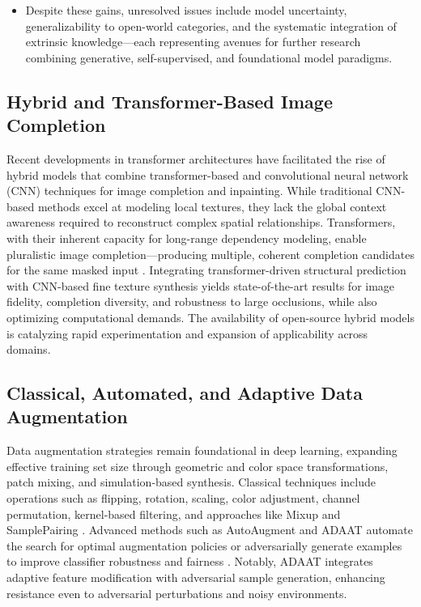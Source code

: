 \begin{itemize}
    \item Despite these gains, unresolved issues include model uncertainty, generalizability to open-world categories, and the systematic integration of extrinsic knowledge—each representing avenues for further research combining generative, self-supervised, and foundational model paradigms.
\end{itemize}

\subsection{Hybrid and Transformer-Based Image Completion}

Recent developments in transformer architectures have facilitated the rise of hybrid models that combine transformer-based and convolutional neural network (CNN) techniques for image completion and inpainting. While traditional CNN-based methods excel at modeling local textures, they lack the global context awareness required to reconstruct complex spatial relationships. Transformers, with their inherent capacity for long-range dependency modeling, enable pluralistic image completion---producing multiple, coherent completion candidates for the same masked input \cite{ref92}. Integrating transformer-driven structural prediction with CNN-based fine texture synthesis yields state-of-the-art results for image fidelity, completion diversity, and robustness to large occlusions, while also optimizing computational demands. The availability of open-source hybrid models is catalyzing rapid experimentation and expansion of applicability across domains.

\subsection{Classical, Automated, and Adaptive Data Augmentation}

Data augmentation strategies remain foundational in deep learning, expanding effective training set size through geometric and color space transformations, patch mixing, and simulation-based synthesis. Classical techniques include operations such as flipping, rotation, scaling, color adjustment, channel permutation, kernel-based filtering, and approaches like Mixup and SamplePairing \cite{ref54,ref55,ref61,ref64}. Advanced methods such as AutoAugment and ADAAT automate the search for optimal augmentation policies or adversarially generate examples to improve classifier robustness and fairness \cite{ref66,ref85}. Notably, ADAAT integrates adaptive feature modification with adversarial sample generation, enhancing resistance even to adversarial perturbations and noisy environments.

